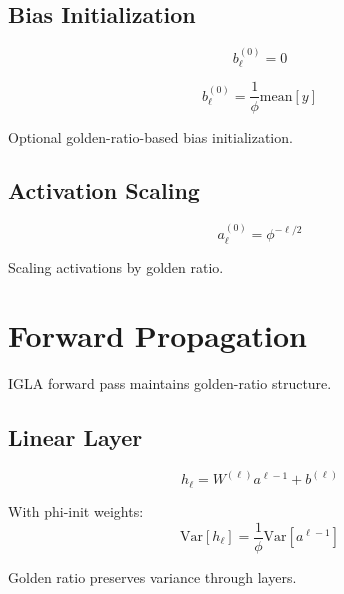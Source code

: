 \subsection{Bias Initialization}

\begin{equation}
b_\ell^{(0)} = 0
\end{equation}

\begin{proposition}
\label{prop:golden-bias}
\begin{equation}
b_\ell^{(0)} = \frac{1}{\phi}\text{mean}[y]
\end{equation}

Optional golden-ratio-based bias initialization.
\end{proposition}

\subsection{Activation Scaling}

\begin{definition}
\label{def:golden-activation}
\begin{equation}
a_\ell^{(0)} = \phi^{-\ell/2}
\end{equation}

Scaling activations by golden ratio.
\end{definition}

\section{Forward Propagation}

IGLA forward pass maintains golden-ratio structure.

\subsection{Linear Layer}

\begin{equation}
h_\ell = W^{(\ell)} a^{\ell-1} + b^{(\ell)}
\end{equation}

\begin{theorem}
\label{thm:golden-linear}
With phi-init weights:
\begin{equation}
\text{Var}[h_\ell] = \frac{1}{\phi}\text{Var}[a^{\ell-1}]
\end{equation}

Golden ratio preserves variance through layers.
\end{theorem}

